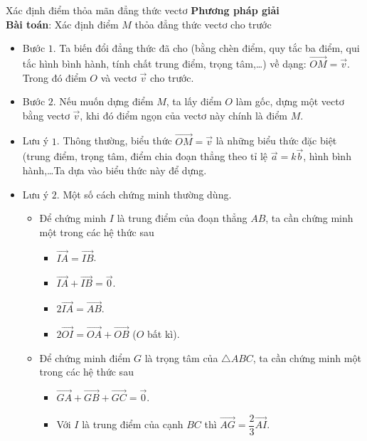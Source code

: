 \begin{dang}{Xác định điểm thỏa mãn đẳng thức vectơ}%
	\textbf{Phương pháp giải}\\
	\textbf{Bài toán}: Xác định điểm $M$ thỏa đẳng thức vectơ cho trước
	\begin{itemize}
		\item Bước $1$. Ta biến đổi đẳng thức đã cho (bằng chèn điểm, quy tắc ba điểm, qui tắc hình bình hành, tính chất trung điểm, trọng tâm,\ldots ) về dạng: $\overrightarrow{OM}=\overrightarrow{v}$. Trong đó điểm $O$  và vectơ $\overrightarrow{v}$ cho trước.
		\item Bước $2$. Nếu muốn dựng điểm $M$, ta lấy điểm $O$ làm gốc, dựng một vectơ bằng vectơ $\overrightarrow{v}$, khi đó điểm ngọn của vectơ này chính là điểm $M$.
	\end{itemize}
	\begin{note} 
		\begin{itemize}
			\item Lưu ý $1$. Thông thường, biểu thức $\overrightarrow{OM}=\overrightarrow{v}$ là những biểu thức đặc biệt (trung điểm, trọng tâm, điểm chia đoạn thẳng theo tỉ lệ $\overrightarrow{a}=k\overrightarrow{b}$, hình bình hành,\ldots Ta dựa vào biểu thức này để dựng.
			\item Lưu ý $2$. Một số cách chứng minh thường dùng.
			\begin{itemize}
				\item Để chứng minh $I$ là trung điểm của đoạn thẳng $AB$, ta cần chứng minh một trong các hệ thức sau
				\begin{itemize}
					\item  $\overrightarrow{IA}=\overrightarrow{IB}$.
					\item $\overrightarrow{IA}+\overrightarrow{IB}=\overrightarrow{0}$.
					\item $2\overrightarrow{IA}=\overrightarrow{AB}$.
					\item $2\overrightarrow{OI}=\overrightarrow{OA}+\overrightarrow{OB}$ ($O$ bất kì).
				\end{itemize}
				\item Để chứng minh điểm $G$ là trọng tâm của $\triangle ABC$, ta cần chứng minh một trong các hệ thức sau
				\begin{itemize}
					\item $\overrightarrow{GA}+\overrightarrow{GB}+\overrightarrow{GC}=\overrightarrow{0}$.
					\item  Với $I$ là trung điểm của cạnh $BC$ thì $\overrightarrow{AG}=\dfrac{2}{3}\overrightarrow{AI}$.

\end{itemize}
\end{itemize}
\end{itemize}
\end{note}
\end{dang}
